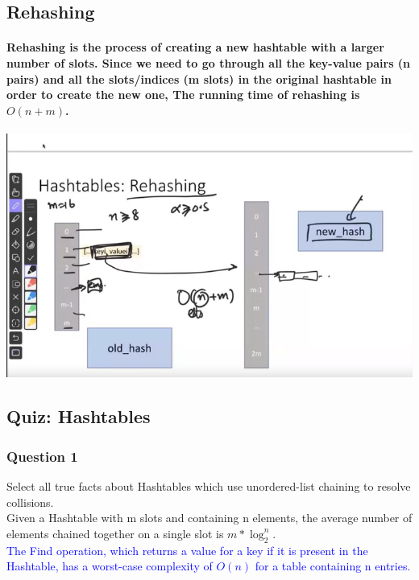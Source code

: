 \documentclass{article}
\begin{document}
\subsection{Rehashing}

\paragraph{Rehashing is the process of creating a new hashtable with a larger number of slots. 
Since we need to go through all the key-value pairs (n pairs) and all the slots/indices (m slots) in the original hashtable in order to create the new one,
The running time of rehashing is $O(n+m)$.\\}


\includegraphics[width=\textwidth]{hashtablerehashing.png}


\subsection{Quiz: Hashtables}

\subsubsection{Question 1}

Select all true facts about Hashtables which use unordered-list chaining to resolve collisions.\\


Given a Hashtable with m slots and containing n elements, the average number of elements chained together on a single slot is $m*\log_2^n$.\\


\textcolor{blue}{The Find operation, which returns a value for a key if it is present in the Hashtable, has a worst-case complexity of $O(n)$ for a table containing n entries.\\}
\end{document}
